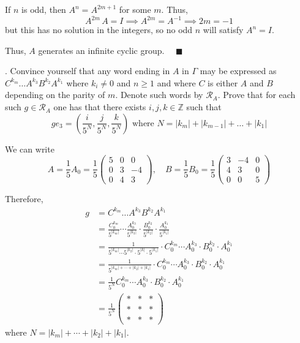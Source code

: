 \documentclass[12pt]{article}
\newcommand{\abs}[1]{\left\vert #1 \right\vert}
\newcommand{\qed}{\quad \blacksquare}
\begin{document}
        If $n$ is odd, then $A^n = A^{2m+1}$ for some $m$. Thus,
        \[A^{2m}\, A = I \implies A^{2m} = A^{-1} \implies 2m = -1\]
        but this has no solution in the integers, so no odd $n$ will satisfy $A^n = I$. 
        
        Thus, $A$ generates an infinite cyclic group. $\qed$

    \color{black}

.  Convince yourself that any word ending in $A$ in $\Gamma$ may be expressed as $C^{k_{m}}\hdots A^{k_{3}}B^{k_{2}}A^{k_{1}}$ where $k_{i} \neq 0$ and $n \geq 1$ and where $C$ is either $A$ and $B$ depending on the parity of $m$.  Denote such words by $\mathcal{R}_{A}$.  Prove that for each such $g \in \mathcal{R}_{A}$ one has that there exists $i,j,k \in \mathbb{Z}$ such that 
\[ge_{3} = 
 \left(
\frac{i}{5^{N}}, \frac{j}{5^{N}}, \frac{k}{5^{N}}
 \right) \text{ where } N = |k_{m}| + |k_{m-1}| + \dots + |k_{1}|\]

    \color{blue}
        We can write 
        \[A = \frac{1}{5}A_0 = \frac{1}{5}\begin{pmatrix}
            5 & 0 & 0\\
            0 & 3 & -4\\
            0 & 4 & 3
        \end{pmatrix}, \quad B = \frac{1}{5}B_0 = \frac{1}{5}\begin{pmatrix}
            3 & -4 & 0\\
            4 & 3 & 0\\
            0 & 0 & 5
        \end{pmatrix}\]

        Therefore, 
        \begin{align*}
            g &= C^{k_m}\dots A^{k_3}B^{k_2}A^{k_1}\\ 
                &= \frac{C_0^{k_m}}{5^{\abs{k_m}}} \cdots \frac{A_0^{k_3}}{5^{\abs{k_3}}} \cdot \frac{B_0^{k_2}}{5^{\abs{k_2}}} \cdot \frac{A_0^{k_1}}{5^{\abs{k_1}}}\\
                &= \frac{1}{5^{\abs{k_m}} \cdots 5^{\abs{k_2}} \cdot 5^{\abs{k}} \cdot 5^{\abs{k_1}}}\cdot C_0^{k_m}\cdots A_0^{k_3} \cdot B_0^{k_2} \cdot A_0^{k_1}\\
                &= \frac{1}{5^{\abs{k_m} + \cdots + \abs{k_2} + \abs{k_1}}} \cdot C_0^{k_m}\cdots A_0^{k_3} \cdot B_0^{k_2} \cdot A_0^{k_1}\\ 
                &= \frac{1}{5^N} C_0^{k_m}\cdots A_0^{k_3} \cdot B_0^{k_2} \cdot A_0^{k_1}\\ 
                &= \frac{1}{5^N} \begin{pmatrix}
                    * & * & *\\ 
                    * & * & *\\
                    * & * & *
                \end{pmatrix}
        \end{align*}
        where $N = \abs{k_m} + \cdots + \abs{k_2} + \abs{k_1}$.
\end{document}
